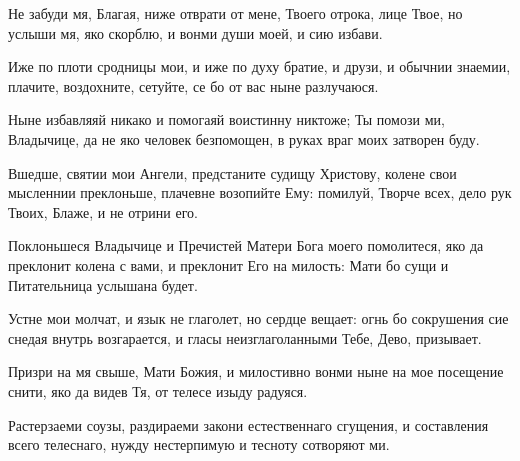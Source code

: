\begin{mymulticols}



Не забуди мя, Благая, ниже отврати от мене, Твоего отрока, лице Твое, но услыши мя, яко скорблю, и вонми души моей, и сию избави.


Иже по плоти сродницы мои, и иже по духу братие, и друзи, и обычнии знаемии, плачите, воздохните, сетуйте, се бо от вас ныне разлучаюся.


Ныне избавляяй никако и помогаяй воистинну никтоже; Ты помози ми, Владычице, да не яко человек безпомощен, в руках враг моих затворен буду.

\slava

Вшедше, святии мои Ангели, предстаните судищу Христову, колене свои мысленнии преклоньше, плачевне возопийте Ему: помилуй, Творче всех, дело рук Твоих, Блаже, и не отрини его.

\inyne

Поклоньшеся Владычице и Пречистей Матери Бога моего помолитеся, яко да преклонит колена с вами, и преклонит Его на милость: Мати бо сущи и Питательница услышана будет.




Устне мои молчат, и язык не глаголет, но сердце вещает: огнь бо сокрушения сие снедая внутрь возгарается, и гласы неизглаголанными Тебе, Дево, призывает.


Призри на мя свыше, Мати Божия, и милостивно вонми ныне на мое посещение снити, яко да видев Тя, от телесе изыду радуяся.


Растерзаеми соузы, раздираеми закони естественнаго сгущения, и составления всего телеснаго, нужду нестерпимую и тесноту сотворяют ми.

\slava


\end{mymulticols}
